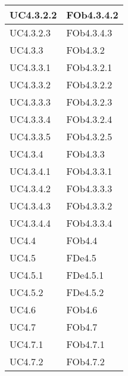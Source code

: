 \begin{longtable}{|l|p{4cm}|}
\hline
		UC4.3.2.2 & FOb4.3.4.2 \linebreak   \\
\hline
		UC4.3.2.3 & FOb4.3.4.3 \linebreak   \\
\hline
		UC4.3.3 & FOb4.3.2 \linebreak   \\
\hline
		UC4.3.3.1 & FOb4.3.2.1 \linebreak   \\
\hline
		UC4.3.3.2 & FOb4.3.2.2 \linebreak   \\
\hline
		UC4.3.3.3 & FOb4.3.2.3 \linebreak   \\
\hline
		UC4.3.3.4 & FOb4.3.2.4 \linebreak   \\
\hline
		UC4.3.3.5 & FOb4.3.2.5 \linebreak   \\
\hline
		UC4.3.4 & FOb4.3.3 \linebreak   \\
\hline
		UC4.3.4.1 & FOb4.3.3.1 \linebreak   \\
\hline
		UC4.3.4.2 & FOb4.3.3.3 \linebreak   \\
\hline
		UC4.3.4.3 & FOb4.3.3.2 \linebreak   \\
\hline
		UC4.3.4.4 & FOb4.3.3.4 \linebreak   \\
\hline
		UC4.4 & FOb4.4 \linebreak   \\
\hline
		UC4.5 & FDe4.5 \linebreak   \\
\hline
		UC4.5.1 & FDe4.5.1 \linebreak   \\
\hline
		UC4.5.2 & FDe4.5.2 \linebreak   \\
\hline
		UC4.6 & FOb4.6 \linebreak   \\
\hline
		UC4.7 & FOb4.7 \linebreak   \\
\hline
		UC4.7.1 & FOb4.7.1 \linebreak   \\
\hline
		UC4.7.2 & FOb4.7.2 \linebreak   \\

\end{longtable}
